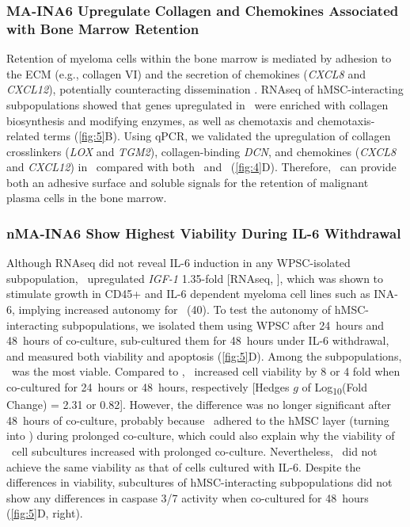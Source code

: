 \subsubsection*{MA-INA6 Upregulate Collagen and Chemokines Associated with Bone Marrow Retention}
Retention of myeloma cells within the bone marrow is mediated by adhesion to the
ECM (e.g., collagen VI) and the secretion of chemokines (\textit{CXCL8} and
\textit{CXCL12}), potentially counteracting dissemination \cite{alsayedMechanismsRegulationCXCR42007,
    katzAdhesionMoleculesLifelines2010}.
RNAseq of hMSC-interacting subpopulations showed that genes upregulated in
\MAina\ were enriched with collagen biosynthesis and modifying enzymes, as well
as chemotaxis and chemotaxis-related terms (\autoref{fig:5}B). Using qPCR, we
validated the upregulation of collagen crosslinkers (\textit{LOX} and
\textit{TGM2}), collagen-binding \textit{DCN}, and chemokines (\textit{CXCL8}
and \textit{CXCL12}) in \MAina\ compared with both \nMAina\ and \CMina\
(\autoref{fig:4}D). Therefore, \MAina\ can provide both an adhesive surface and
soluble signals for the retention of malignant plasma cells in the bone marrow.


\subsubsection*{nMA-INA6 Show Highest Viability During IL-6 Withdrawal}
Although RNAseq did not reveal IL-6 induction in any WPSC-isolated
subpopulation, \nMAina\ upregulated \textit{IGF-1} 1.35-fold [RNAseq,
\versus{nMA}{\MAandCM}], which was shown to stimulate growth in CD45+ and IL-6
dependent myeloma cell lines such as INA-6, implying increased autonomy for
\nMAina\ (40). To test the autonomy of hMSC-interacting \INA subpopulations, we
isolated them using WPSC after \SI{24}{hours} and \SI{48}{hours} of co-culture,
sub-cultured them for \SI{48}{hours} under IL-6 withdrawal, and measured both
viability and apoptosis (\autoref{fig:5}D). Among the subpopulations, \nMAina\
was the most viable. Compared to \MAina, \nMAina\ increased cell viability by 8
or 4 fold when co-cultured for \SI{24}{hours} or \SI{48}{hours}, respectively
    [Hedges $g$ of Log\textsubscript{10}(Fold Change) = 2.31 or 0.82]. However, the
difference was no longer significant after \SI{48}{hours} of co-culture,
probably because \nMAina\ adhered to the hMSC layer (turning into \MAina) during
prolonged co-culture, which could also explain why the viability of \MAina\ cell
subcultures increased with prolonged co-culture. Nevertheless, \nMAina\ did not
achieve the same viability as that of \INA cells cultured with IL-6. Despite the
differences in viability, subcultures of hMSC-interacting subpopulations did not
show any differences in caspase 3/7 activity when co-cultured for \SI{48}{hours}
(\autoref{fig:5}D, right).

